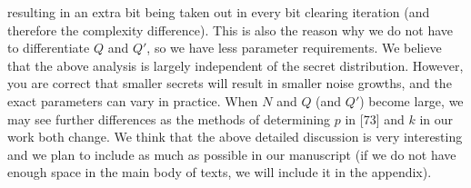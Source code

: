 resulting in an extra bit being taken out in every bit clearing iteration
(and therefore the complexity difference).
This is also the reason
why we do not have to differentiate $Q$ and $Q'$, so we have less parameter
requirements. We believe that the above
analysis is largely independent of the secret distribution. However,
you are correct that smaller secrets will result in smaller noise growths,
and the exact parameters can vary in practice. 
When $N$ and $Q$ (and $Q'$) become large, we may see further differences
as the methods of determining $p$ in [73] and $k$ in our work both change.
We think that the above detailed discussion is very interesting and we plan
to include as much as possible in our manuscript 
(if we do not have enough space in the main body of texts,
we will include it in the appendix).